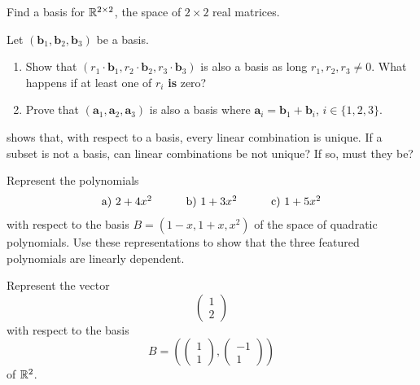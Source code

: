 \begin{exercise}{}{}
 Find a basis for $\mathbb{R}^{2 \times 2}$, the space of $2 \times 2$ real matrices.
\end{exercise}
\begin{exercise}{}{}
 Let $(\mathbf{b}_1,\mathbf{b}_2,\mathbf{b}_3)$ be a basis.
 \begin{enumerate}[label=(\alph*)]
  \item Show that $(r_1 \cdot \mathbf{b}_1, r_2 \cdot \mathbf{b}_2, r_3 \cdot
   \mathbf{b}_3)$ is also a basis as long $r_1,r_2,r_3 \neq 0$. What happens if
   at least one of $r_i$ \textbf{is} zero?
  \item Prove that $(\mathbf{a}_1,\mathbf{a}_2,\mathbf{a}_3)$ is also a basis
   where $\mathbf{a}_i = \mathbf{b}_1 + \mathbf{b}_i$, $i \in \{1,2,3\}$.
 \end{enumerate}
\end{exercise}
\begin{exercise}{}{}
  shows that, with respect to a
 basis, every linear combination is unique. If a subset is not a basis, can
 linear combinations be not unique? If so, must they be?
\end{exercise}
\begin{exercise}{}{}
 Represent the polynomials
 \[
  \begin{array}{r r r}
   \text{a) } 2 + 4x^2 \hspace{2em}& \text{b) } 1 + 3x^2 \hspace{2em}& \text{c)
   } 1 + 5x^2
  \end{array}
 \]
 with respect to the basis $B = (1 - x, 1 + x, x^2)$ of the space of quadratic
 polynomials. Use these representations to show that the three featured
 polynomials are linearly dependent.
\end{exercise}
\begin{exercise}{}{}
 Represent the vector
 \[
  \begin{pmatrix}
   1\\
   2
  \end{pmatrix}
 \]
 with respect to the basis
 \[
  B = \left( 
  \begin{pmatrix}
   1\\
   1
  \end{pmatrix},
  \begin{pmatrix}
   -1\\
   1
  \end{pmatrix}
  \right)
 \]
 of $\mathbb{R}^2$.
\end{exercise}
